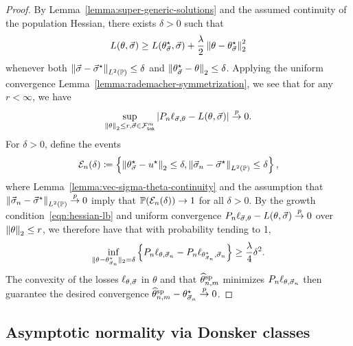 \begin{proof}
	By Lemma~\ref{lemma:super-generic-solutions}
	and the assumed continuity of the population Hessian,
	there exists $\delta > 0$ such that
	\begin{equation}
		L(\theta, \vec{\sigma}) \ge L(\theta^\star_{\vec{\sigma}}, \vec{\sigma})
		+ \frac{\lambda}{2} \left\|{\theta - \theta^\star_{\vec{\sigma}}}\right\|_2^2
		\label{eqn:hessian-lb}
	\end{equation}
	whenever both $\left\|{\vec{\sigma} - \vec{\sigma}^\star}\right\|_{L^2(\mathbb{P})} \le \delta$ and
	$\left\|{\theta^\star_{\vec{\sigma}} - \theta}\right\|_2 \le \delta$. Applying
	the uniform convergence
	Lemma~\ref{lemma:rademacher-symmetrization}, we see that
	for any $r < \infty$, we have
	\begin{equation*}
		\sup_{\left\|{\theta}\right\|_2 \le r, \vec{\sigma} \in \mathcal{F}_{\mathsf{link}}^m}
		|P_n \ell_{\vec{\sigma},\theta} - L(\theta, \vec{\sigma})| \stackrel{p}{\rightarrow} 0.
	\end{equation*}
	For $\delta > 0$, define the events
	\begin{equation*}
		\mathcal{E}_n(\delta) \coloneqq \left \{
		\left\|{\theta^\star_{\vec{\sigma}} - u^\star}\right\|_2 \le \delta,
		\left\|{\vec{\sigma}_n - \vec{\sigma}^\star}\right\|_{L^2(\mathbb{P})} \le \delta \right\},
	\end{equation*}
	where
	Lemma~\ref{lemma:vec-sigma-theta-continuity}
	and the assumption that $\left\|{\vec{\sigma}_n - \vec{\sigma}^\star}\right\|_{L^2(\mathbb{P})}
	\stackrel{p}{\rightarrow} 0$ imply that $\mathbb{P}(\mathcal{E}_n(\delta)) \to 1$ for all $\delta > 0$.
	By the growth condition~\eqref{eqn:hessian-lb}
	and uniform convergence
	$P_n \ell_{\vec{\sigma},\theta} - L(\theta,\vec{\sigma}) \stackrel{p}{\rightarrow} 0$
	over $\left\|{\theta}\right\|_2 \le r$,
	we therefore have that with probability tending to 1, 
	\begin{equation*}
		\inf_{\|{\theta - \theta^\star_{\vec{\sigma}_n}}\|_2 = \delta}
		\left\{P_n \ell_{\theta,\vec{\sigma}_n} - P_n \ell_{\theta^\star_{\vec{\sigma}_n},
			\vec{\sigma}_n} \right\}
		\ge \frac{\lambda}{4} \delta^2.
	\end{equation*}
	The convexity of the losses $\ell_{\theta,\vec{\sigma}}$ in $\theta$ and that
	$\widehat{\theta}^{\textup{sp}}_{n,m}$ minimizes $P_n \ell_{\theta,\vec{\sigma}_n}$ then
	guarantee the desired convergence $\widehat{\theta}^{\textup{sp}}_{n,m} - \theta^\star_{\vec{\sigma}_n} \stackrel{p}{\rightarrow} 0$.
\end{proof}

\subsection{Asymptotic normality via Donsker classes}

\providecommand{\G}{\mathbb{G}}

